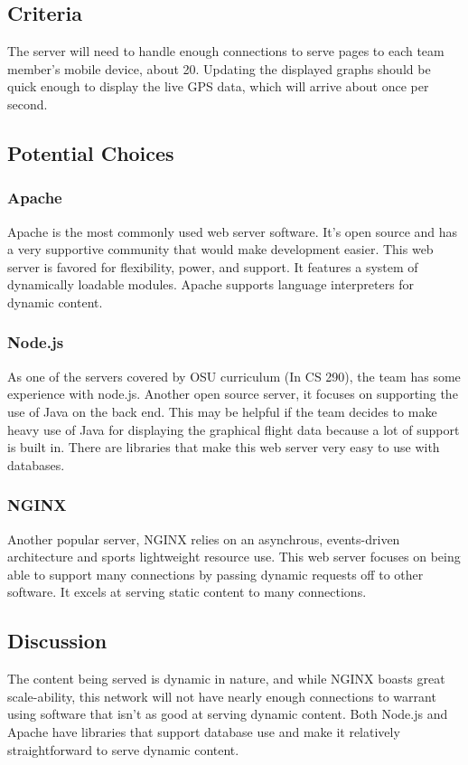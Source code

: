 \documentclass[onecolumn, draftclsnofoot,10pt, compsoc]{IEEEtran}
\begin{document}
\subsection{Criteria}
The server will need to handle enough connections to serve pages to each team member's mobile device, about 20. 
Updating the displayed graphs should be quick enough to display the live GPS data, which will arrive about once per second.

\subsection{Potential Choices}

\subsubsection{Apache}
Apache is the most commonly used web server software. 
It's open source and has a very supportive community that would make development easier.\cite{3}
This web server is favored for flexibility, power, and support. 
It features a system of dynamically loadable modules.
Apache supports language interpreters for dynamic content.\cite{4}

\subsubsection{Node.js}
As one of the servers covered by OSU curriculum (In CS 290), the team has some experience with node.js. 
Another open source server, it focuses on supporting the use of Java on the back end.
This may be helpful if the team decides to make heavy use of Java for displaying the graphical flight data because a lot of support is built in.
There are libraries that make this web server very easy to use with databases.\cite{8}

\subsubsection{NGINX}
Another popular server, NGINX relies on an asynchrous, events-driven architecture and sports lightweight resource use.
This web server focuses on being able to support many connections by passing dynamic requests off to other software.
It excels at serving static content to many connections.\cite{4}

\subsection{Discussion}
The content being served is dynamic in nature, and while NGINX boasts great scale-ability, this network will not have nearly enough connections to warrant using software that isn't as good at serving dynamic content.
Both Node.js and Apache have libraries that support database use and make it relatively straightforward to serve dynamic content. 
\end{document}
